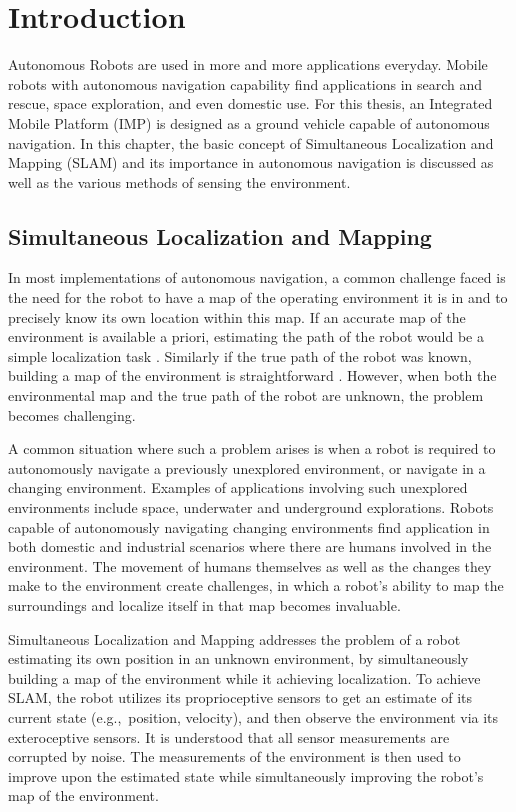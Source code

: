 \chapter{Introduction} 
	
	Autonomous Robots are used in more and more applications everyday. Mobile robots with autonomous navigation capability find applications in search and rescue, space exploration, and even domestic use\cite{search1,search2,marsRover}. For this thesis, an Integrated Mobile Platform (IMP) is designed as a ground vehicle capable of autonomous navigation. In this chapter, the basic concept of Simultaneous Localization and Mapping (SLAM) and its importance in autonomous navigation is discussed as well as the various methods of sensing the environment.
	
	\section{Simultaneous Localization and Mapping}
	
	In most implementations of autonomous navigation, a common challenge faced is the need for the robot to have a map of the operating environment it is in and to precisely know its own location within this map. If an accurate map of the environment is available a priori, estimating the path of the robot would be a simple localization task \cite{Thrun1999}. Similarly if the true path of the robot was known, building a map of the environment is straightforward \cite{Tripathi2014,lakemeyer2003}. However, when both the environmental map and the true path of the robot are unknown, the problem becomes challenging.
	
	A common situation where such a problem arises is when a robot is required to autonomously navigate a previously unexplored environment, or navigate in a changing environment. Examples of  applications involving such unexplored environments include space, underwater and underground explorations\cite{marsRover,mineMapping,underwaterSLAM}. Robots capable of autonomously navigating changing environments find application in both domestic and industrial scenarios where there are humans involved in the environment. The movement of humans themselves as well as the changes they make to the environment create challenges, in which a robot's ability to map the surroundings and localize itself in that map becomes invaluable. 
	
	Simultaneous Localization and Mapping addresses the problem of a robot estimating its own position in an unknown environment, by simultaneously building a map of the environment while it achieving localization. To achieve SLAM, the robot utilizes its proprioceptive sensors to get an estimate of its current state (e.g.,\ position, velocity), and then observe the environment via its exteroceptive sensors. It is understood that all sensor measurements are corrupted by noise. The measurements of the environment is then used to improve upon the estimated state while simultaneously improving the robot's map of the environment. 
	
